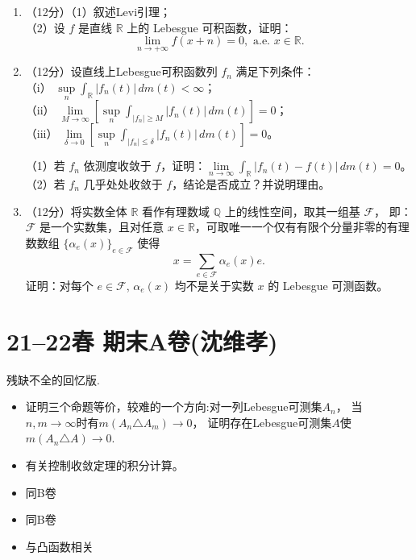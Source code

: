 \begin{enumerate}
\item（12分）（1）叙述Levi引理；\\
（2）设 $f$ 是直线 $\mathbb{R}$ 上的 Lebesgue 可积函数，证明：
$$\lim_{n \rightarrow+\infty} f(x+n)=0, \text { a.e. } x \in \mathbb{R}.$$

\item（12分）设直线上Lebesgue可积函数列 $f_{n}$ 满足下列条件：\\
（i） $\sup\limits_{n} \int_{\mathbb{R}}|f_{n}(t)|\, dm(t)<\infty$；\\
（ii） $\lim\limits_{M \rightarrow \infty}\left[\sup\limits_{n} \int_{|f_{n}| \geqslant M}|f_{n}(t)|\, dm(t)\right]=0$；\\
（iii） $\lim\limits_{\delta \rightarrow 0}\left[\sup\limits_{n} \int_{|f_{n}| \leqslant \delta}|f_{n}(t)|\, dm(t)\right]=0$。

（1）若 $f_{n}$ 依测度收敛于 $f$，证明：$\lim\limits_{n \rightarrow \infty} \int_{\mathbb{R}}|f_{n}(t)-f(t)|\, dm(t)=0$。\\
（2）若 $f_{n}$ 几乎处处收敛于 $f$，结论是否成立？并说明理由。

\item（12分）将实数全体 $\mathbb{R}$ 看作有理数域 $\mathbb{Q}$ 上的线性空间，取其一组基 $\mathcal{F}$，
即：$\mathcal{F}$ 是一个实数集，且对任意 $x \in \mathbb{R}$，可取唯一一个仅有有限个分量非零的有理数数组 $\{\alpha_{e}(x)\}_{e \in \mathcal{F}}$ 使得
$$x=\sum_{e \in \mathcal{F}} \alpha_{e}(x) e.$$
证明：对每个 $e \in \mathcal{F}$, $\alpha_{e}(x)$ 均不是关于实数 $x$ 的 Lebesgue 可测函数。
\end{enumerate}

\section{21--22春 期末A卷(沈维孝)}

残缺不全的回忆版.

\begin{itemize}
\item[一、]
证明三个命题等价，较难的一个方向:对一列Lebesgue可测集$ A_{n} $，
当$n,m\to \infty$时有$m(A_{n} \triangle A_{m})\to 0$，
证明存在Lebesgue可测集$A$使$m(A_{n} \triangle A)\to 0$.

\item[二、]
有关控制收敛定理的积分计算。

\item[三、]
同B卷

\item[四、]
同B卷

\item[五、]
与凸函数相关
\end{itemize}


